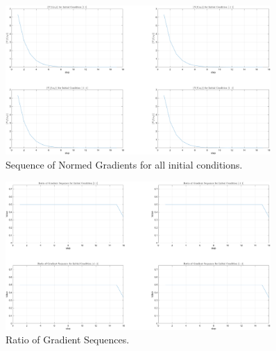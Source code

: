 \begin{figure}[!h]
    \centering
    \includegraphics[width = 0.9\textwidth]{Plots/NormGradient.png}
    \caption{Sequence of Normed Gradients for all initial conditions. }
    \label{fig:normedGradient}
\end{figure}
\clearpage
\newpage
\begin{figure}
    \centering
    \includegraphics[width = 0.9\textwidth]{Plots/RatioSeq.png}
    \caption{Ratio of Gradient Sequences.}
    \label{fig:RatioSeq}
\end{figure}
\clearpage
\newpage
